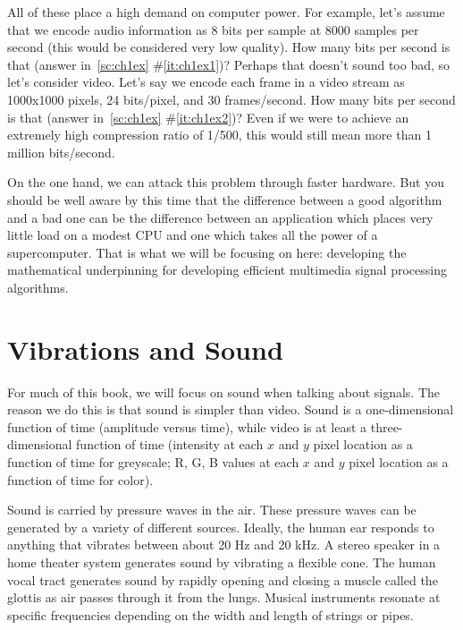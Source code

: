 All of these place a high demand on computer power. For example, let's
assume that we encode audio information as 8 bits per sample at 8000
samples per second (this would be considered very low quality). How
many bits per second is that (answer in~\ref{sc:ch1ex}
\#\ref{it:ch1ex1})? Perhaps that doesn't sound too bad, so let's
consider video. Let's say we encode each frame in a video stream as
1000x1000 pixels, 24 bits/pixel, and 30 frames/second.  How many bits
per second is that (answer in~\ref{sc:ch1ex}
\#\ref{it:ch1ex2})?
Even if we were to achieve an extremely high compression ratio of
1/500, this would still mean more than 1 million bits/second.

On the one hand, we can attack this problem through faster
hardware. But you should be well aware by this time that the
difference between a good algorithm and a bad one can be the
difference between an application which places very little load on a
modest CPU and one which takes all the power of a supercomputer. That
is what we will be focusing on here: developing the mathematical
underpinning for developing efficient multimedia signal processing
algorithms.

\section{Vibrations and Sound}

For much of this book, we will focus on sound when talking about
signals. The reason we do this is that sound is simpler than
video. Sound is a one-dimensional function of time (amplitude versus
time), while video is at least a three-dimensional function of time
(intensity at each $x$ and $y$ pixel location as a function of time
for greyscale; R, G, B values at each $x$ and $y$ pixel location as a
function of time for color).

Sound is carried by pressure waves in the air. These pressure waves can be generated by a variety of different sources. Ideally, the human ear responds to anything that vibrates between about 20 Hz and 20 kHz. A stereo speaker in a home theater system generates sound by vibrating a flexible cone. The human vocal tract generates sound by rapidly opening and closing a muscle called the glottis as air passes through it from the lungs. Musical instruments resonate at specific frequencies depending on the width and length of strings or pipes.

